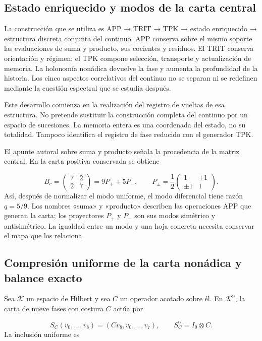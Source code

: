 \subsection{Estado enriquecido y modos de la carta central}
\label{viii:tm-add-c1}
La construcción que se utiliza es APP → TRIT → TPK → estado enriquecido → estructura discreta conjunta del continuo. APP conserva sobre el mismo soporte las evaluaciones de suma y producto, sus cocientes y residuos. El TRIT conserva orientación y régimen; el TPK compone selección, transporte y actualización de memoria. La holonomía nonádica devuelve la fase y aumenta la profundidad de la historia. Los cinco aspectos correlativos del continuo no se separan ni se redefinen mediante la cuestión espectral que se estudia después.

Este desarrollo comienza en la realización del registro de vueltas de esa estructura. No pretende sustituir la construcción completa del continuo por un espacio de sucesiones. La memoria entera es una coordenada del estado, no su totalidad. Tampoco identifica el registro de fase reducido con el generador TPK.

El apunte autoral sobre suma y producto señala la procedencia de la matriz central. En la carta positiva conservada se obtiene

\[
B_c=\begin{pmatrix}7&2\\2&7\end{pmatrix}
=9P_++5P_-,\qquad
P_\pm=\frac12\begin{pmatrix}1&\pm1\\\pm1&1\end{pmatrix}.
\]
Así, después de normalizar el modo uniforme, el modo diferencial tiene razón \(q=5/9\). Los nombres «suma» y «producto» describen las operaciones APP que generan la carta; los proyectores \(P_+\) y \(P_-\) son sus modos simétrico y antisimétrico. La igualdad entre un modo y una hoja concreta necesita conservar el mapa que los relaciona.


\subsection{Compresión uniforme de la carta nonádica y balance exacto}
\label{viii:tm-add-c2}
Sea \(\mathcal K\) un espacio de Hilbert y sea \(C\) un operador acotado sobre él. En \(\mathcal K^9\), la carta de nueve fases con costura \(C\) actúa por

\[
S_C(v_0,\ldots,v_8)=(Cv_8,v_0,\ldots,v_7),
\qquad S_C^9=I_9\otimes C.
\]
La inclusión uniforme es

